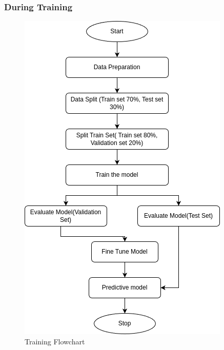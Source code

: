 \documentclass{ioereport}
\begin{document}
\subsubsection{During Training}
\begin{figure}[H]
    \centering
    \includegraphics[scale=0.8]{images/training flowchart.png}
    \caption{Training Flowchart}
    \label{fig:flowtra}
\end{figure}
\end{document}
